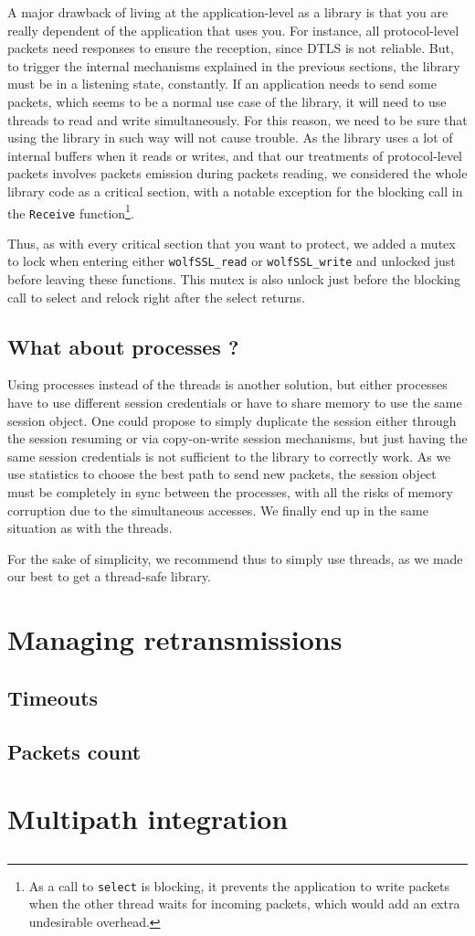 A major drawback of living at the application-level as a library is that you are really dependent of the application that uses you. For instance, all protocol-level packets need responses to ensure the reception, since DTLS is not reliable. But, to trigger the internal mechanisms explained in the previous sections, the library must be in a listening state, constantly. If an application needs to send some packets, which seems to be a normal use case of the library, it will need to use threads to read and write simultaneously. For this reason, we need to be sure that using the library in such way will not cause trouble. As the library uses a lot of internal buffers when it reads or writes, and that our treatments of protocol-level packets involves packets emission during packets reading, we considered the whole library code as a critical section, with a notable exception for the blocking call in the \texttt{Receive} function\footnote{As a call to \texttt{select} is blocking, it prevents the application to write packets when the other thread waits for incoming packets, which would add an extra undesirable overhead.}.

Thus, as with every critical section that you want to protect, we added a mutex to lock when entering either \texttt{wolfSSL\_read} or \texttt{wolfSSL\_write} and unlocked just before leaving these functions. This mutex is also unlock just before the blocking call to select and relock right after the select returns.

\subsection{What about processes ?}

Using processes instead of the threads is another solution, but either processes have to use different session credentials or have to share memory to use the same session object. One could propose to simply duplicate the session either through the session resuming or via copy-on-write session mechanisms, but just having the same session credentials is not sufficient to the library to correctly work. As we use statistics to choose the best path to send new packets, the session object must be completely in sync between the processes, with all the risks of memory corruption due to the simultaneous accesses. We finally end up in the same situation as with the threads.

For the sake of simplicity, we recommend thus to simply use threads, as we made our best to get a thread-safe library.

\section{Managing retransmissions}

\subsection{Timeouts}

\subsection{Packets count}

\section{Multipath integration}
\subsection{}
